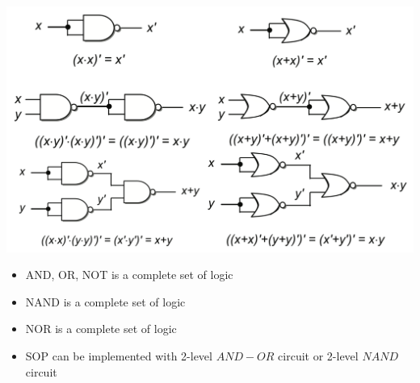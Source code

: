\documentclass[a4paper]{article} \usepackage[backend=biber, style=numeric, sorting=none]{biblatex}
\begin{document}
\begin{multicols*}{4}
\includegraphics[scale=0.1]{nor_nand.png}

\begin{itemize}
\item {AND, OR, NOT} is a complete set of logic
\item {NAND} is a complete set of logic
\item {NOR} is a complete set of logic
\item SOP can be implemented with 2-level $AND-OR$ circuit or 2-level $NAND$ circuit


\end{itemize}
\end{multicols*}
\end{document}
